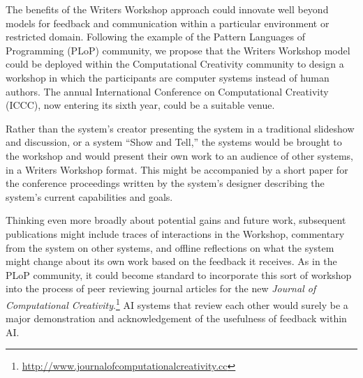 
The benefits of the Writers Workshop approach could innovate well beyond models for 
feedback and communication within a particular environment or restricted domain. 
Following the example of the Pattern Languages of Programming (PLoP) community, we propose that the Writers Workshop model could be deployed
within the Computational Creativity community to design a workshop in
which the participants are computer systems instead of human authors.
The annual International Conference on Computational Creativity
(ICCC), now entering its sixth year, could be a suitable venue. 

Rather than the system's creator presenting the system in a
traditional slideshow and discussion, or a system ``Show and Tell,''
the systems would be brought to the workshop and would present their
own work to an audience of other systems, in a Writers Workshop
format.  This might be accompanied by a short paper for the conference
proceedings written by the system's designer describing the system's
current capabilities and goals.  

Thinking even more broadly about potential gains and future work, subsequent publications might include
traces of interactions in the Workshop, commentary from the system on
other systems, and offline reflections on what the system might change
about its own work based on the feedback it receives.  As in the PLoP
community, it could become standard to incorporate this sort of workshop
into the process of peer reviewing journal articles for the new \emph{Journal of
  Computational Creativity}.\footnote{\url{http://www.journalofcomputationalcreativity.cc}} AI systems that review each other would surely be a major demonstration and acknowledgement of the usefulness of feedback within AI.